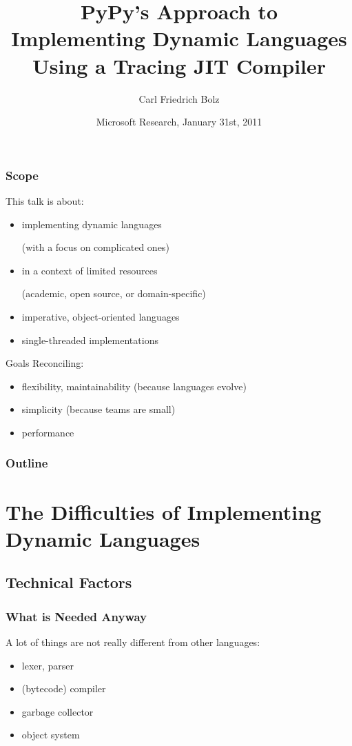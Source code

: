 \documentclass[utf8x]{beamer}
\title[PyPy Implements Dynamic Languages Using a Tracing JIT]{
PyPy's Approach to \\
Implementing Dynamic Languages \\
Using a Tracing JIT Compiler}
\author{Carl Friedrich Bolz}
\institute[Heinrich-Heine-Universität Düsseldorf]
{
  Institut für Informatik\\
  Heinrich-Heine-Universität Düsseldorf
}
\date{
Microsoft Research, January 31st, 2011
}
\begin{document}
\begin{frame}
  \titlepage
\end{frame}


\begin{frame}
  \frametitle{Scope}
  This talk is about:

  \begin{itemize}
  \item implementing dynamic languages \par(with a focus on complicated ones)
  \item in a context of limited resources \par(academic, open source, or
    domain-specific)
  \item imperative, object-oriented languages
  \item single-threaded implementations
  \end{itemize}
  \pause
  \begin{block}{Goals}
    Reconciling:
    \begin{itemize}
    \item flexibility, maintainability (because languages evolve)
    \item simplicity (because teams are small)
    \item performance
    \end{itemize}
  \end{block}
\end{frame}

\begin{frame}
  \frametitle{Outline}
  \tableofcontents[pausesections]
\end{frame}

\section{The Difficulties of Implementing Dynamic Languages}

\subsection{Technical Factors}

\begin{frame}
  \frametitle{What is Needed Anyway}
  A lot of things are not really different from other languages:
  \begin{itemize}
      \item lexer, parser
      \item (bytecode) compiler
      \item garbage collector
      \item object system
  \end{itemize}
\end{frame}
\end{document}
